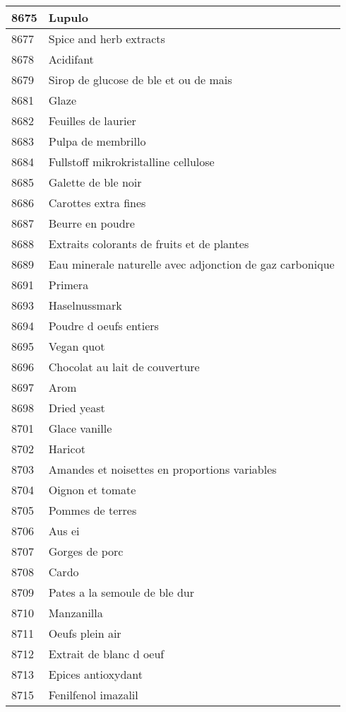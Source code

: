\begin{longtable}{|l|l|}
8675 & Lupulo \\ \hline 
8677 & Spice and herb extracts \\ \hline 
8678 & Acidifant \\ \hline 
8679 & Sirop de glucose de ble et ou de mais \\ \hline 
8681 & Glaze \\ \hline 
8682 & Feuilles de laurier \\ \hline 
8683 & Pulpa de membrillo \\ \hline 
8684 & Fullstoff mikrokristalline cellulose \\ \hline 
8685 & Galette de ble noir \\ \hline 
8686 & Carottes extra fines \\ \hline 
8687 & Beurre en poudre \\ \hline 
8688 & Extraits colorants de fruits et de plantes \\ \hline 
8689 & Eau minerale naturelle avec adjonction de gaz carbonique \\ \hline 
8691 & Primera \\ \hline 
8693 & Haselnussmark \\ \hline 
8694 & Poudre d oeufs entiers \\ \hline 
8695 & Vegan quot \\ \hline 
8696 & Chocolat au lait de couverture \\ \hline 
8697 & Arom \\ \hline 
8698 & Dried yeast \\ \hline 
8701 & Glace vanille \\ \hline 
8702 & Haricot \\ \hline 
8703 & Amandes et noisettes en proportions variables \\ \hline 
8704 & Oignon et tomate \\ \hline 
8705 & Pommes de terres \\ \hline 
8706 & Aus ei \\ \hline 
8707 & Gorges de porc \\ \hline 
8708 & Cardo \\ \hline 
8709 & Pates a la semoule de ble dur \\ \hline 
8710 & Manzanilla \\ \hline 
8711 & Oeufs plein air \\ \hline 
8712 & Extrait de blanc d oeuf \\ \hline 
8713 & Epices antioxydant \\ \hline 
8715 & Fenilfenol imazalil \\ \hline 

\end{longtable}
